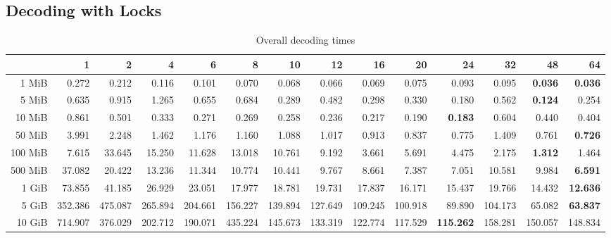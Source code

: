 \subsection{Decoding with Locks}
\begin{centering}
\begin{table}[!h]
	\caption{Overall decoding times}
	\begin{tabular}{rrrrrrrrrrrrrr}
		\toprule
		\diagbox[width=7em]{Sizes}{Threads}  & 1  &      2  &      4  &      6  &      8  &      10 &      12 &      16 &      20 &      24 &      32 &      48 &      64 \\
		\midrule
		1 MiB   &   0.272 &   0.212 &   0.116 &   0.101 &   0.070 &   0.068 &   0.066 &   0.069 &   0.075 &   0.093 &   0.095 &   \textbf{0.036} &   \textbf{0.036} \\
		5 MiB   &   0.635 &   0.915 &   1.265 &   0.655 &   0.684 &   0.289 &   0.482 &   0.298 &   0.330 &   0.180 &   0.562 &   \textbf{0.124} &   0.254 \\
		10 MiB  &   0.861 &   0.501 &   0.333 &   0.271 &   0.269 &   0.258 &   0.236 &   0.217 &   0.190 &   \textbf{0.183} &   0.604 &   0.440 &   0.404 \\
		50 MiB  &   3.991 &   2.248 &   1.462 &   1.176 &   1.160 &   1.088 &   1.017 &   0.913 &   0.837 &   0.775 &   1.409 &   0.761 &   \textbf{0.726} \\
		100 MiB &   7.615 &  33.645 &  15.250 &  11.628 &  13.018 &  10.761 &   9.192 &   3.661 &   5.691 &   4.475 &   2.175 &   \textbf{1.312} &   1.464 \\
		500 MiB &  37.082 &  20.422 &  13.236 &  11.344 &  10.774 &  10.441 &   9.767 &   8.661 &   7.387 &   7.051 &  10.581 &   9.984 &   \textbf{6.591} \\
		1 GiB   &  73.855 &  41.185 &  26.929 &  23.051 &  17.977 &  18.781 &  19.731 &  17.837 &  16.171 &  15.437 &  19.766 &  14.432 &  \textbf{12.636} \\
		5 GiB   & 352.386 & 475.087 & 265.894 & 204.661 & 156.227 & 139.894 & 127.649 & 109.245 & 100.918 &  89.890 & 104.173 &  65.082 &  \textbf{63.837} \\
		10 GiB  & 714.907 & 376.029 & 202.712 & 190.071 & 435.224 & 145.673 & 133.319 & 122.774 & 117.529 & \textbf{115.262} & 158.281 & 150.057 & 148.834 \\
		\bottomrule
	\end{tabular}
\end{table}


\end{centering}
